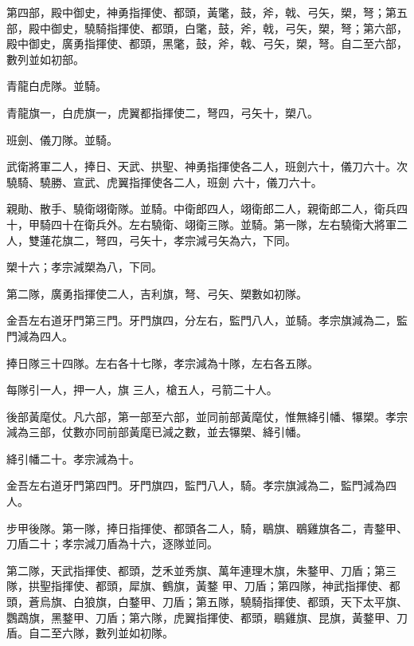 \begin{pinyinscope}
 第四部，殿中御史，神勇指揮使、都頭，黃氅，鼓，斧，戟、弓矢，槊，弩；第五部，殿中御史，驍騎指揮使、都頭，白氅，鼓，斧，戟，弓矢，槊，弩；第六部，殿中御史，廣勇指揮使、都頭，黑氅，鼓，斧，戟、弓矢，槊，弩。自二至六部，數列並如初部。



 青龍白虎隊。並騎。



 青龍旗一，白虎旗一，虎翼都指揮使二，弩四，弓矢十，槊八。



 班劍、儀刀隊。並騎。



 武衛將軍二人，捧日、天武、拱聖、神勇指揮使各二人，班劍六十，儀刀六十。次驍騎、驍勝、宣武、虎翼指揮使各二人，班劍
 六十，儀刀六十。



 親勛、散手、驍衛翊衛隊。並騎。中衛郎四人，翊衛郎二人，親衛郎二人，衛兵四十，甲騎四十在衛兵外。左右驍衛、翊衛三隊。並騎。第一隊，左右驍衛大將軍二人，雙蓮花旗二，弩四，弓矢十，孝宗減弓矢為六，下同。



 槊十六；孝宗減槊為八，下同。



 第二隊，廣勇指揮使二人，吉利旗，弩、弓矢、槊數如初隊。



 金吾左右道牙門第三門。牙門旗四，分左右，監門八人，並騎。孝宗旗減為二，監門減為四人。



 捧日隊三十四隊。左右各十七隊，孝宗減為十隊，左右各五隊。



 每隊引一人，押一人，旗
 三人，槍五人，弓箭二十人。



 後部黃麾仗。凡六部，第一部至六部，並同前部黃麾仗，惟無絳引幡、犦槊。孝宗減為三部，仗數亦同前部黃麾已減之數，並去犦槊、絳引幡。



 絳引幡二十。孝宗減為十。



 金吾左右道牙門第四門。牙門旗四，監門八人，騎。孝宗旗減為二，監門減為四人。



 步甲後隊。第一隊，捧日指揮使、都頭各二人，騎，鶡旗、鶡雞旗各二，青鍪甲、刀盾二十；孝宗減刀盾為十六，逐隊並同。



 第二隊，天武指揮使、都頭，芝禾並秀旗、萬年連理木旗，朱鍪甲、刀盾；第三隊，拱聖指揮使、都頭，犀旗、鶴旗，黃鍪
 甲、刀盾；第四隊，神武指揮使、都頭，蒼烏旗、白狼旗，白鍪甲、刀盾；第五隊，驍騎指揮使、都頭，天下太平旗、鸚鵡旗，黑鍪甲、刀盾；第六隊，虎翼指揮使、都頭，鶡雞旗、昆旗，黃鍪甲、刀盾。自二至六隊，數列並如初隊。




\end{pinyinscope}
